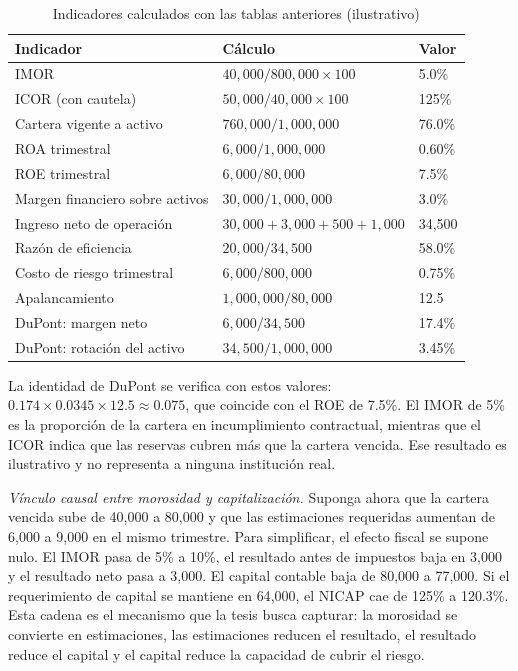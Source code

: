 \begin{table}[htbp]
\centering
\small
\caption{Indicadores calculados con las tablas anteriores (ilustrativo)}
\label{tab:indicadores_ilustrativos}
\begin{tabular}{lll}
\toprule
Indicador & Cálculo & Valor \\
\midrule
IMOR & $40{,}000/800{,}000\times 100$ & 5.0\% \\
ICOR (con cautela) & $50{,}000/40{,}000\times 100$ & 125\% \\
Cartera vigente a activo & $760{,}000/1{,}000{,}000$ & 76.0\% \\
ROA trimestral & $6{,}000/1{,}000{,}000$ & 0.60\% \\
ROE trimestral & $6{,}000/80{,}000$ & 7.5\% \\
Margen financiero sobre activos & $30{,}000/1{,}000{,}000$ & 3.0\% \\
Ingreso neto de operación & $30{,}000+3{,}000+500+1{,}000$ & 34{,}500 \\
Razón de eficiencia & $20{,}000/34{,}500$ & 58.0\% \\
Costo de riesgo trimestral & $6{,}000/800{,}000$ & 0.75\% \\
Apalancamiento & $1{,}000{,}000/80{,}000$ & 12.5 \\
DuPont: margen neto & $6{,}000/34{,}500$ & 17.4\% \\
DuPont: rotación del activo & $34{,}500/1{,}000{,}000$ & 3.45\% \\
\bottomrule
\end{tabular}
\end{table}

La identidad de DuPont se verifica con estos valores: $0.174\times 0.0345\times 12.5\approx 0.075$, que coincide con el ROE de 7.5\%. El IMOR de 5\% es la proporción de la cartera en incumplimiento contractual, mientras que el ICOR indica que las reservas cubren más que la cartera vencida. Ese resultado es ilustrativo y no representa a ninguna institución real.

\textit{Vínculo causal entre morosidad y capitalización.} Suponga ahora que la cartera vencida sube de 40{,}000 a 80{,}000 y que las estimaciones requeridas aumentan de 6{,}000 a 9{,}000 en el mismo trimestre. Para simplificar, el efecto fiscal se supone nulo. El IMOR pasa de 5\% a 10\%, el resultado antes de impuestos baja en 3{,}000 y el resultado neto pasa a 3{,}000. El capital contable baja de 80{,}000 a 77{,}000. Si el requerimiento de capital se mantiene en 64{,}000, el NICAP cae de 125\% a 120.3\%. Esta cadena es el mecanismo que la tesis busca capturar: la morosidad se convierte en estimaciones, las estimaciones reducen el resultado, el resultado reduce el capital y el capital reduce la capacidad de cubrir el riesgo.

